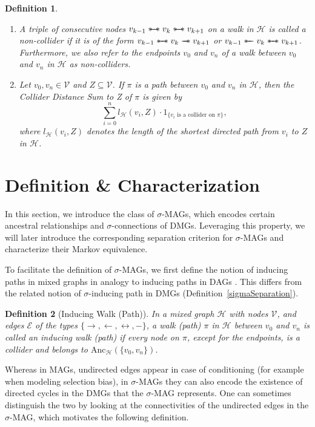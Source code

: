 \documentclass[accepted]{uai2025} %
\newtheorem{definition}{Definition}
\newcommand{\anc}{\text{Anc}}
\newcommand{\huh}{\mathrel{\leftrightarrow}}
\newcommand{\sut}{\mathrel{{\ast\mkern-11mu\relbar\mkern-9mu\relbar}}}
\newcommand{\tus}{\mathrel{{\relbar\mkern-11mu\relbar\mkern-11mu\ast}}}
\newcommand{\sus}{\mathrel{{\ast\mkern-11mu\relbar\mkern-9mu\relbar\mkern-11mu\ast}}}
\begin{document}
\begin{definition}
\begin{enumerate}
    \item A triple of consecutive nodes $v_{k-1}\sus v_k\sus v_{k+1}$ on a walk in $\mathcal{H}$ is called a \emph{non-collider} if it is of the form $v_{k-1}\sus v_k\tus v_{k+1}$ or $v_{k-1}\sut v_k\sus v_{k+1}$. Furthermore, we also refer to the endpoints $v_0$ and $v_n$ of a walk between $v_0$ and $v_n$ in $\mathcal{H}$ as \emph{non-colliders}.
    \item Let \( v_0, v_n \in \mathcal{V} \) and \( Z \subseteq \mathcal{V} \). If \( \pi \) is a path between \( v_0 \) and \( v_n \) in \( \mathcal{H} \), then the \emph{Collider Distance Sum to Z}  of \( \pi \) is given by  
\[
\sum_{i=0}^{n} l_\mathcal{H}(v_i, Z) \cdot 1_{\{ v_i \text{ is a collider on } \pi \}},
\]
where \( l_\mathcal{H}(v_i,Z) \) denotes the length of the shortest directed path from \( v_i \) to \( Z \) in \( \mathcal{H} \).

\end{enumerate}
\end{definition}





\section{Definition \& Characterization} \label{section:1}
In this section, we introduce the class of $\sigma$-MAGs, which encodes certain ancestral relationships and $\sigma$-connections of DMGs. Leveraging this property, we will later introduce the corresponding separation criterion for $\sigma$-MAGs and characterize their Markov equivalence.

To facilitate the definition of $\sigma$-MAGs, we first define the notion of inducing paths in mixed graphs in analogy to inducing paths in DAGs \citep{VermaPearl1990}. This differs from the related notion of $\sigma$-inducing path in DMGs (Definition~\ref{sigmaSeparation}).

\begin{definition}[Inducing Walk (Path)]
In a mixed graph $\mathcal{H}$ with nodes $ \mathcal{V} $, and edges $ \mathcal{E} $ of the types $\{\rightarrow, \leftarrow, \huh , -\}$, a walk (path) \( \pi \) in \(\mathcal{H}\) between \( v_0 \) and \( v_n \) is called an \emph{inducing walk (path)} if every node on \( \pi \), except for the endpoints, is a collider and belongs to \( \anc_\mathcal{H}(\{v_0, v_n\}) \).  
\end{definition}

Whereas in MAGs, undirected edges appear in case of conditioning (for example when modeling selection bias), in $\sigma$-MAGs they can also encode the existence of directed cycles in the DMGs that the $\sigma$-MAG represents. One can sometimes distinguish the two by looking at the connectivities of the undirected edges in the $\sigma$-MAG, which motivates the following definition. 
\end{document}
